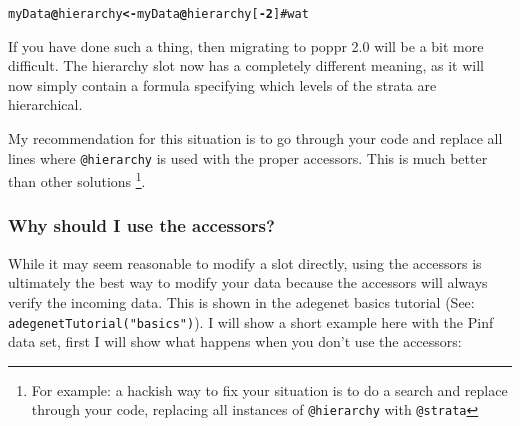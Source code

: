 \documentclass[letterpaper]{article}\usepackage[]{graphicx}\usepackage[]{color}
\makeatletter
\newcommand{\hlnum}[1]{\textcolor[rgb]{0.502,0,0.502}{\textbf{#1}}}%
\newcommand{\hlcom}[1]{\textcolor[rgb]{1,0.502,0}{#1}}%
\newcommand{\hlopt}[1]{\textcolor[rgb]{1,0,0.502}{\textbf{#1}}}%
\newcommand{\hlstd}[1]{\textcolor[rgb]{0,0,0}{#1}}%
\newcommand{\hlkwb}[1]{\textcolor[rgb]{0.502,0.502,0.753}{\textbf{#1}}}%
\newcommand{\hlkwc}[1]{\textcolor[rgb]{0,0.502,0.753}{#1}}%
\newenvironment{kframe}{%
 \def\at@end@of@kframe{}%
 \ifinner\ifhmode%
  \def\at@end@of@kframe{\end{minipage}}%
  \begin{minipage}{\columnwidth}%
 \fi\fi%
 \def\FrameCommand##1{\hskip\@totalleftmargin \hskip-\fboxsep
 \colorbox{shadecolor}{##1}\hskip-\fboxsep
     \hskip-\linewidth \hskip-\@totalleftmargin \hskip\columnwidth}%
 \MakeFramed {\advance\hsize-\width
   \@totalleftmargin\z@ \linewidth\hsize
   \@setminipage}}%
 {\par\unskip\endMakeFramed%
 \at@end@of@kframe}
\newenvironment{knitrout}{}{} %
\makeatother
\begin{document}
\begin{knitrout}
\color{fgcolor}\begin{kframe}
\begin{alltt}
\hlstd{myData}\hlopt{@}\hlkwc{hierarchy} \hlkwb{<-} \hlstd{myData}\hlopt{@}\hlkwc{hierarchy}\hlstd{[}\hlopt{-}\hlnum{2}\hlstd{]} \hlcom{# wat}
\end{alltt}
\end{kframe}
\end{knitrout}

If you have done such a thing, then migrating to poppr 2.0 will be a bit more 
difficult. The hierarchy slot now has a completely different meaning, as it 
will now simply contain a formula specifying which levels of the strata are
hierarchical. 

My recommendation for this situation is to go through your code and replace all
lines where \texttt{@hierarchy} is used with the proper accessors. This is much
better than other solutions \footnote{For example: a hackish way to fix your
situation is to do a search and replace through your code, replacing all
instances of \texttt{@hierarchy} with \texttt{@strata}}.

\subsubsection{Why should I use the accessors?}

While it may seem reasonable to modify a slot directly, using the accessors is 
ultimately the best way to modify your data because the accessors will always 
verify the incoming data. This is shown in the adegenet basics tutorial (See:
\texttt{adegenetTutorial("basics")}). I will show a short example here with
the Pinf data set, first I will show what happens when you don't use the
accessors:
\end{document}
